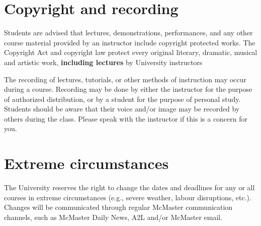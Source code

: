 \documentclass[12pt]{article}
\begin{document}
\section*{Copyright and recording}

Students are advised that lectures, demonstrations, performances, and
any other course material provided by an instructor include copyright
protected works. The Copyright Act and copyright law protect every
original literary, dramatic, musical and artistic work,
\textbf{including lectures} by University instructors

The recording of lectures, tutorials, or other methods of instruction
may occur during a course. Recording may be done by either the
instructor for the purpose of authorized distribution, or by a student
for the purpose of personal study. Students should be aware that their
voice and/or image may be recorded by others during the class. Please
speak with the instructor if this is a concern for you.


\section*{Extreme circumstances}

The University reserves the right to change the dates and deadlines for
any or all courses in extreme circumstances (e.g., severe weather,
labour disruptions, etc.). Changes will be communicated through regular
McMaster communication channels, such as McMaster Daily News, A2L and/or
McMaster email.
\end{document}
